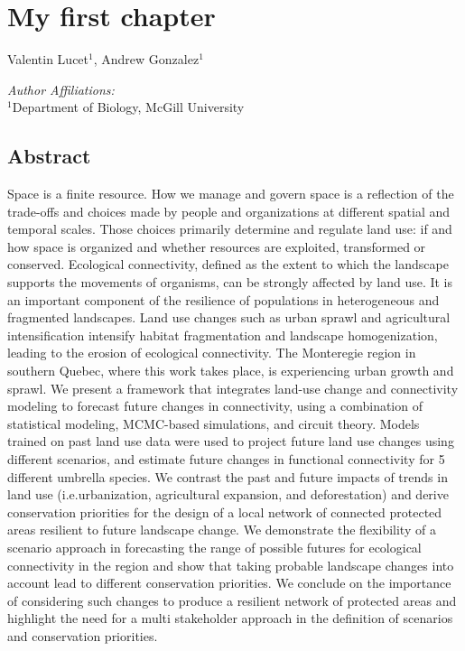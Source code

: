 \chapter{My first chapter}
\begin{center}
{Valentin Lucet$^{1}$, Andrew Gonzalez$^{1}$}\\
\end{center}
\textit{Author Affiliations:}\\
\normalsize{$^{1}$Department of Biology, McGill University}\\
\section{Abstract}
Space is a finite resource. How we manage and govern space is a reflection of the trade-offs and choices made by people and organizations at different spatial and temporal scales. Those choices primarily determine and regulate land use: if and how space is organized and whether resources are exploited, transformed or conserved. Ecological connectivity, defined as the extent to which the landscape supports the movements of organisms, can be strongly affected by land use. It is an important component of the resilience of populations in heterogeneous and fragmented landscapes. Land use changes such as urban sprawl and agricultural intensification intensify habitat fragmentation and landscape homogenization, leading to the erosion of ecological connectivity. The Monteregie region in southern Quebec, where this work takes place, is experiencing urban growth and sprawl. We present a framework that integrates land-use change and connectivity modeling to forecast future changes in connectivity, using a combination of statistical modeling, MCMC-based simulations, and circuit theory. Models trained on past land use data were used to project future land use changes using different scenarios, and estimate future changes in functional connectivity for 5 different umbrella species. We contrast the past and future impacts of trends in land use (i.e.urbanization, agricultural expansion, and deforestation) and derive conservation priorities for the design of a local network of connected protected areas resilient to future landscape change. We demonstrate the flexibility of a scenario approach in forecasting the range of possible futures for ecological connectivity in the region and show that taking probable landscape changes into account lead to different conservation priorities. We conclude on the importance of considering such changes to produce a resilient network of protected areas and highlight the need for a multi stakeholder approach in the definition of scenarios and conservation priorities.
\\
